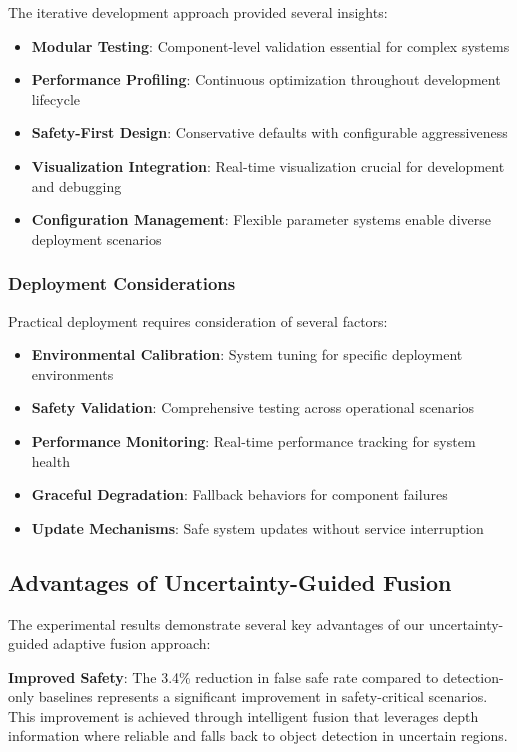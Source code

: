 \documentclass[12pt,oneside]{book}
\begin{document}
The iterative development approach provided several insights:

\begin{itemize}
\item \textbf{Modular Testing}: Component-level validation essential for complex systems
\item \textbf{Performance Profiling}: Continuous optimization throughout development lifecycle
\item \textbf{Safety-First Design}: Conservative defaults with configurable aggressiveness
\item \textbf{Visualization Integration}: Real-time visualization crucial for development and debugging
\item \textbf{Configuration Management}: Flexible parameter systems enable diverse deployment scenarios
\end{itemize}

\subsubsection{Deployment Considerations}

Practical deployment requires consideration of several factors:

\begin{itemize}
\item \textbf{Environmental Calibration}: System tuning for specific deployment environments
\item \textbf{Safety Validation}: Comprehensive testing across operational scenarios
\item \textbf{Performance Monitoring}: Real-time performance tracking for system health
\item \textbf{Graceful Degradation}: Fallback behaviors for component failures
\item \textbf{Update Mechanisms}: Safe system updates without service interruption
\end{itemize}

\subsection{Advantages of Uncertainty-Guided Fusion}

The experimental results demonstrate several key advantages of our uncertainty-guided adaptive fusion approach:

\textbf{Improved Safety}: The 3.4\% reduction in false safe rate compared to detection-only baselines represents a significant improvement in safety-critical scenarios. This improvement is achieved through intelligent fusion that leverages depth information where reliable and falls back to object detection in uncertain regions.
\end{document}
